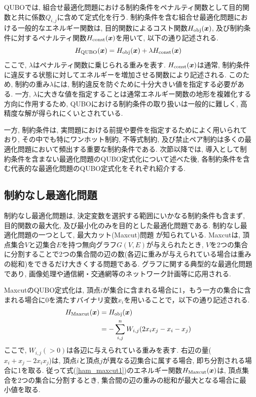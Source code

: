 \documentclass[submit,techrep,noauthor]{ipsj}
\begin{document}
QUBOでは, 組合せ最適化問題における制約条件をペナルティ関数として目的関数と共に係数$Q_{i,j}$に含めて定式化を行う. 制約条件を含む組合せ最適化問題における一般的なエネルギー関数は, 目的関数によるコスト関数$H_{\rm{obj}}(\bm{x})$, 及び制約条件に対するペナルティ関数$H_{\rm{const}}(\bm{x})$を用いて, 以下の通り記述される.
\begin{equation}
H_{\rm{QUBO}}(\bm{x}) = H_{\rm{obj}}(\bm{x}) + \lambda H_{\rm{const}}(\bm{x})
\label{H_qubo}
\end{equation}
ここで, $\lambda$はペナルティ関数に乗じられる重みを表す. $H_{\rm{const}}(\bm{x})$は通常, 制約条件に違反する状態に対してエネルギーを増加させる関数により記述される. このため, 制約の重み$\lambda$には, 制約違反を防ぐために十分大きい値を指定する必要がある. 一方, $\lambda$に大きな値を指定することは通常エネルギー関数の地形を複雑化する方向に作用するため, QUBOにおける制約条件の取り扱いは一般的に難しく, 高精度な解が得られにくいとされている\cite{kumagai, komatsu, kumagai2}. 

一方, 制約条件は, 実問題における前提や要件を指定するためによく用いられており, その中でも特にワンホット制約, 不等式制約, 及び禁止ペア制約は多くの最適化問題において頻出する重要な制約条件である. 次節以降では, 導入として制約条件を含まない最適化問題のQUBO定式化について述べた後, 各制約条件を含む代表的な最適化問題のQUBO定式化をそれぞれ紹介する.

\subsection{制約なし最適化問題}

制約なし最適化問題は, 決定変数を選択する範囲にいかなる制約条件も含まず, 目的関数の最大化, 及び最小化のみを目的とした最適化問題である. 制約なし最適化問題の一つとして, 最大カット(Maxcut)問題 が知られている. Maxcutは, 頂点集合$V$と辺集合$E$を持つ無向グラフ$G(V,E)$が与えられたとき, $V$を2つの集合に分割することで2つの集合間の辺の数(各辺に重みが与えられている場合は重みの総和)をできるだけ大きくする問題である\cite{maxcut}. グラフに関する典型的な最適化問題であり, 画像処理や通信網・交通網等のネットワーク計画等に応用される.

MaxcutのQUBO定式化は, 頂点$i$が集合に含まれる場合に1，もう一方の集合に含まれる場合に0を満たすバイナリ変数$x_{i}$を用いることで，以下の通り記述される. 
\begin{align}
H_{\rm{Maxcut}}(\bm{x}) &= H_{\rm{obj}}(\bm{x})\nonumber\\
&= -\sum_{i,j}^{n}W_{i,j}(2x_{i}x_{j}-x_{i}-x_{j})
\label{ham_maxcut1}
\end{align}
ここで, $W_{i,j}(>0)$は各辺に与えられている重みを表す. 右辺の量($x_{i}+x_{j}-2x_{i}x_{j}$)は, 頂点$i$と頂点$j$が異なる辺集合に属する場合, 即ち分割される場合に1を取る. 従って式(\ref{ham_maxcut1})のエネルギー関数$H_{\rm{Maxcut}}(\bm{x})$は, 頂点集合を2つの集合に分割するとき, 集合間の辺の重みの総和が最大となる場合に最小値を取る.
\end{document}
